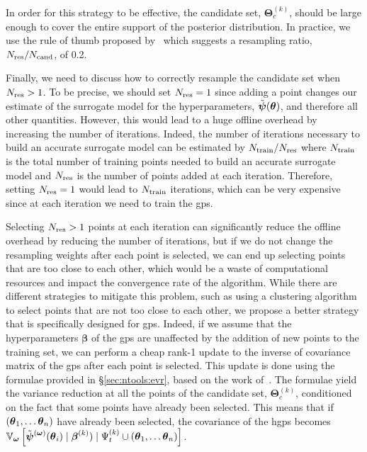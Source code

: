 \smallskip
In order for this strategy to be effective, the candidate set, $\boldsymbol{\Theta}_c^{(k)}$, should be large enough to cover the entire support of the posterior distribution. In practice, we use the rule of thumb proposed by~\cite{gelman2014} which suggests a resampling ratio, ${N_{\mathrm{res}}}/N_{\mathrm{cand}}$, of 0.2.

\smallskip
Finally, we need to discuss how to correctly resample the candidate set when ${N_{\mathrm{res}}} > 1$. To be precise, we should set ${N_{\mathrm{res}}}=1$ since adding a point changes our estimate of the surrogate model for the hyperparameters, $\tilde{\boldsymbol{\psi}}(\boldsymbol{\theta})$, and therefore all other quantities. However, this would lead to a huge offline overhead by increasing the number of iterations. Indeed, the number of iterations necessary to build an accurate surrogate model can be estimated by $N_{\mathrm{train}}/{N_{\mathrm{res}}}$ where $N_{\mathrm{train}}$ is the total number of training points needed to build an accurate surrogate model and ${N_{\mathrm{res}}}$ is the number of points added at each iteration. Therefore, setting ${N_{\mathrm{res}}}=1$ would lead to $N_{\mathrm{train}}$ iterations, which can be very expensive since at each iteration we need to train the \glspl{gp}.

\smallskip
Selecting ${N_{\mathrm{res}}} > 1$ points at each iteration can significantly reduce the offline overhead by reducing the number of iterations, but if we do not change the resampling weights after each point is selected, we can end up selecting points that are too close to each other, which would be a waste of computational resources and impact the convergence rate of the algorithm. While there are different strategies to mitigate this problem, such as using a clustering algorithm to select points that are not too close to each other, we propose a better strategy that is specifically designed for \glspl{gp}. Indeed, if we assume that the hyperparameters $\boldsymbol{\beta}$ of the \glspl{gp} are unaffected by the addition of new points to the training set, we can perform a cheap rank-1 update to the inverse of covariance matrix of the \glspl{gp} after each point is selected. This update is done using the formulae provided in \S\ref{sec:ntools:evr}, based on the work of~\cite{global_var_1}. The formulae yield the variance reduction at all the points of the candidate set, $\boldsymbol{\Theta}_c^{(k)}$, conditioned on the fact that some points have already been selected. This means that if $(\boldsymbol{\theta}_1, \ldots \boldsymbol{\theta}_n)$ have already been selected, the covariance of the \glspl{hgp} becomes $\mathbb{V}_{\boldsymbol{\omega}} \left[ \tilde{\boldsymbol{\psi}}^{(\boldsymbol{\omega})}(\boldsymbol{\theta}_i) \mid \boldsymbol{\beta}^{(k)}) \mid \Psi_t^{(k)} \cup (\boldsymbol{\theta}_1, \ldots \boldsymbol{\theta}_n)\right]$.

